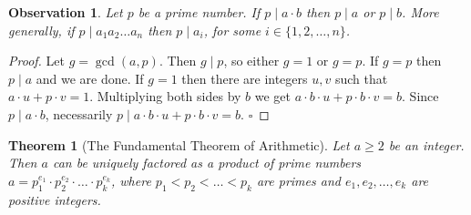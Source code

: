 \documentclass[10pt,varwidth=6in,margin=0.2in,preview]{standalone}
\newtheorem*{_theorem}{Theorem}
\newtheorem*{_observation}{Observation}
\begin{document}
\begin{flushleft}
\begin{_observation} Let $p$ be a prime number. If $p \mid a \cdot b$ then $p \mid a$ or $p \mid b$. More generally, if $p \mid a_1 a_2 \ldots a_n$ then $p \mid a_i$, for some $i \in \{1, 2, \ldots, n\}$.
\end{_observation}

\begin{proof}
Let $g = \gcd(a, p)$. Then $g \mid p$, so either $g = 1$ or $g = p$.
If $g = p$ then $p \mid a$ and we are done.
If $g = 1$ then there are integers $u, v$ such that $a \cdot u + p \cdot v = 1$.
Multiplying both sides by $b$ we get $a \cdot b \cdot u + p \cdot b \cdot v = b$.
Since $p \mid a \cdot b$, necessarily $p \mid a \cdot b \cdot u + p \cdot b \cdot v = b$. $\square$
\end{proof}


\begin{_theorem}[The Fundamental Theorem of Arithmetic]
Let $a \ge 2$ be an integer. Then $a$ can be uniquely factored as a product of prime numbers $a = p_1^{e_1} \cdot p_2^{e_2} \cdot \ldots \cdot p_k^{e_k}$, where $p_1 < p_2 < \ldots < p_k$ are primes and $e_1, e_2, \ldots, e_k$ are positive integers.
\end{_theorem}


\end{flushleft}
\end{document}

